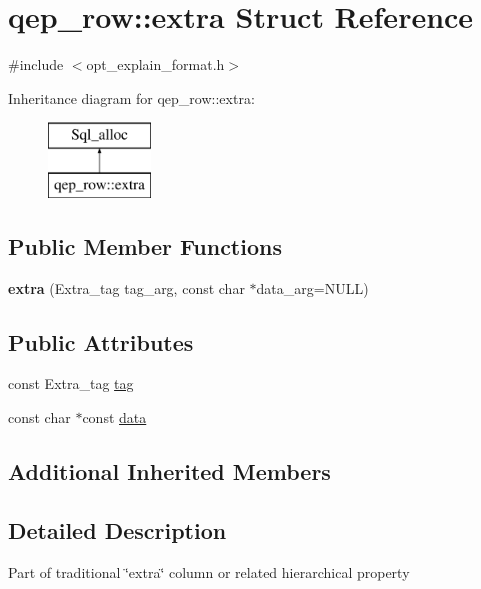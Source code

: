 \hypertarget{structqep__row_1_1extra}{}\section{qep\+\_\+row\+:\+:extra Struct Reference}
\label{structqep__row_1_1extra}


{\ttfamily \#include $<$opt\+\_\+explain\+\_\+format.\+h$>$}

Inheritance diagram for qep\+\_\+row\+:\+:extra\+:\begin{figure}[H]
\begin{center}
\leavevmode
\includegraphics[height=2.000000cm]{structqep__row_1_1extra}
\end{center}
\end{figure}
\subsection*{Public Member Functions}
\begin{DoxyCompactItemize}
\item 
\mbox{\label{structqep__row_1_1extra_a4ff3505886d107e00fbc3eea9bf2dd97}} 
{\bfseries extra} (Extra\+\_\+tag tag\+\_\+arg, const char $\ast$data\+\_\+arg=N\+U\+LL)
\end{DoxyCompactItemize}
\subsection*{Public Attributes}
\begin{DoxyCompactItemize}
\item 
const Extra\+\_\+tag \mbox{\hyperlink{structqep__row_1_1extra_af4492316c31fc24a65e9dffe13fd6465}{tag}}
\item 
const char $\ast$const \mbox{\hyperlink{structqep__row_1_1extra_aff5697395d1ac5ec1d0aa9a9809979f1}{data}}
\end{DoxyCompactItemize}
\subsection*{Additional Inherited Members}


\subsection{Detailed Description}
Part of traditional \char`\"{}extra\char`\"{} column or related hierarchical property 

